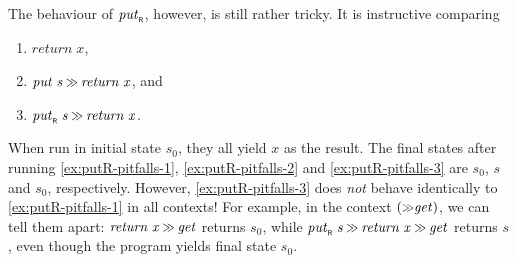 \documentclass{llncs}
\newcommand{\Varid}[1]{\mathit{#1}}
\let\Varid\mathit
\begin{document}
The behaviour of \ensuremath{\Varid{put}_{\scaleobj{0.7}{\sf R}}}, however, is still rather tricky. It is instructive comparing
\begin{enumerate}[label=(\alph*)]
\item \ensuremath{\Varid{return}\;\Varid{x}},  \label{ex:putR-pitfalls-1}
\item \ensuremath{\Varid{put}\;\Varid{s}\mathbin{\hstretch{0.7}{>\!\!>}}\Varid{return}\;\Varid{x}}, and \label{ex:putR-pitfalls-2}
\item \ensuremath{\Varid{put}_{\scaleobj{0.7}{\sf R}}\;\Varid{s}\mathbin{\hstretch{0.7}{>\!\!>}}\Varid{return}\;\Varid{x}}. \label{ex:putR-pitfalls-3}
\end{enumerate}
When run in initial state \ensuremath{\Varid{s}_{0}}, they all yield \ensuremath{\Varid{x}} as the result.
The final states after running \ref{ex:putR-pitfalls-1}, \ref{ex:putR-pitfalls-2} and \ref{ex:putR-pitfalls-3} are \ensuremath{\Varid{s}_{0}}, \ensuremath{\Varid{s}} and \ensuremath{\Varid{s}_{0}}, respectively.
However, \ref{ex:putR-pitfalls-3} does {\em not} behave identically to \ref{ex:putR-pitfalls-1} in all contexts!
For example, in the context \ensuremath{(\mathbin{\hstretch{0.7}{>\!\!>}}\Varid{get})}, we can tell them apart:
\ensuremath{\Varid{return}\;\Varid{x}\mathbin{\hstretch{0.7}{>\!\!>}}\Varid{get}} returns \ensuremath{\Varid{s}_{0}}, while \ensuremath{\Varid{put}_{\scaleobj{0.7}{\sf R}}\;\Varid{s}\mathbin{\hstretch{0.7}{>\!\!>}}\Varid{return}\;\Varid{x}\mathbin{\hstretch{0.7}{>\!\!>}}\Varid{get}} returns \ensuremath{\Varid{s}}, even though the program yields final state \ensuremath{\Varid{s}_{0}}.
\end{document}
